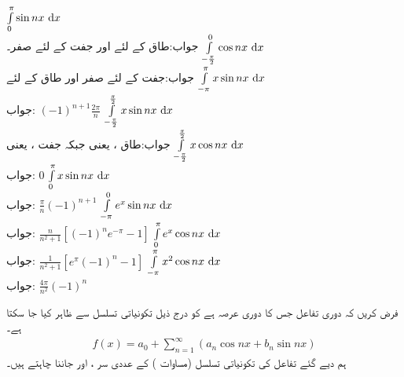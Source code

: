 \quad
$\int\limits_0^{\pi}\sin nx\,\dif x$\\
جواب:\quad طاق  کے لئے  اور جفت  کے لئے صفر۔
\quad
$\int\limits_{-\frac{\pi}{2}}^0\cos nx\,\dif x$\\
جواب:\quad جفت  کے لئے صفر اور طاق  کے لئے 
\quad
$\int\limits_{-\pi}^{\pi}x\sin nx\,\dif x$\\
جواب:\quad 
$(-1)^{n+1}\tfrac{2\pi}{n}$
\quad
$\int\limits_{-\frac{\pi}{2}}^{\frac{\pi}{2}}x\sin nx\,\dif x$\\
جواب:\quad طاق ،  یعنی  جبکہ جفت ،  یعنی 
\quad
$\int\limits_{-\frac{\pi}{2}}^{\frac{\pi}{2}}x\cos nx\,\dif x$\\
جواب:\quad 
$0$
\quad
$\int\limits_{0}^{\pi}x\sin nx\,\dif x$\\
جواب:\quad
$\tfrac{\pi}{n}(-1)^{n+1}$
\quad
$\int\limits_{-\pi}^{0} e^x\sin nx\,\dif x$\\
جواب:\quad
$\tfrac{n}{n^2+1}[(-1)^ne^{-\pi}-1]$
\quad
$\int\limits_{0}^{\pi} e^x\cos nx\,\dif x$\\
جواب:\quad
$\tfrac{1}{n^2+1}[e^{\pi}(-1)^n-1]$
\quad
$\int\limits_{-\pi}^{\pi} x^2\cos nx\,\dif x$\\
جواب:\quad
$\tfrac{4\pi}{n^2}(-1)^n$

فرض کریں کہ دوری تفاعل  جس کا دوری عرصہ  ہے کو درج ذیل تکونیاتی تسلسل سے ظاہر کیا جا سکتا ہے۔
\begin{align}\label{مساوات_فوریئر_تسلسل_الف}
f(x)=a_0+\sum_{n=1}^{\infty}(a_n\cos nx+b_n\sin nx)
\end{align}
ہم دیے گئے تفاعل  کی تکونیاتی تسلسل (مساوات ) کے عددی سر ، اور  جاننا چاہتے ہیں۔

